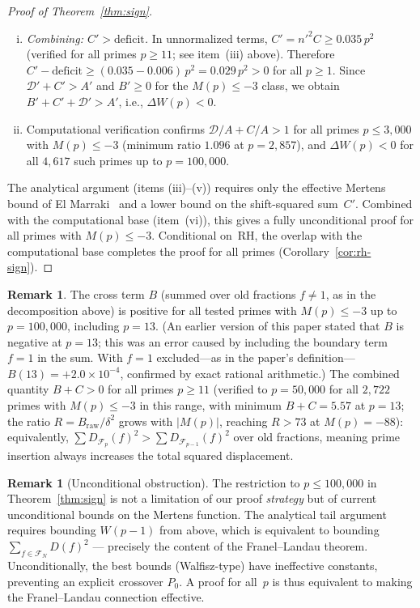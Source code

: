 \documentclass[11pt]{article}
\theoremstyle{definition}
\newtheorem{remark}[theorem]{Remark}
\newcommand{\F}{\mathcal{F}}
\begin{document}
\begin{proof}[Proof of Theorem~\ref{thm:sign}]
\begin{enumerate}[(i)]
\item \emph{Combining: $C' > \text{deficit}$.}
In unnormalized terms, $C' = {n'}^2 C \ge 0.035\,p^2$
(verified for all primes $p \ge 11$; see item~(iii) above).
Therefore $C' - \text{deficit} \ge (0.035 - 0.006)\,p^2
= 0.029\,p^2 > 0$ for all $p \ge 1$.
Since $\mathcal{D}' + C' > A'$ and $B' \ge 0$ for the
$M(p) \le -3$ class, we obtain
$B' + C' + \mathcal{D}' > A'$, i.e., $\Delta W(p) < 0$.

\item Computational verification confirms
$\mathcal{D}/A + C/A > 1$ for all primes $p \le 3{,}000$
with $M(p) \le -3$ (minimum ratio $1.096$ at $p = 2{,}857$),
and $\Delta W(p) < 0$ for all $4{,}617$ such primes up to
$p = 100{,}000$.
\end{enumerate}

The analytical argument (items (iii)--(v)) requires only the
effective Mertens bound of El Marraki~\cite{ElMarraki1995}
and a lower bound on the shift-squared sum~$C'$.  Combined
with the computational base (item~(vi)), this gives a fully
unconditional proof for all primes with $M(p) \le -3$.
Conditional on~RH, the overlap with the computational
base completes the proof for all primes
(Corollary~\ref{cor:rh-sign}).
\end{proof}

\begin{remark}
The cross term $B$ (summed over old fractions $f \ne 1$,
as in the decomposition above) is positive for all tested
primes with $M(p) \le -3$ up to $p = 100{,}000$, including
$p = 13$.  (An earlier version of this paper stated that
$B$ is negative at $p = 13$; this was an error caused by
including the boundary term $f = 1$ in the sum.  With $f = 1$
excluded---as in the paper's definition---$B(13) = +2.0
\times 10^{-4}$, confirmed by exact rational arithmetic.)
The combined quantity $B + C > 0$ for all primes
$p \ge 11$ (verified to $p = 50{,}000$ for all $2{,}722$ primes
with $M(p) \le -3$ in this range, with minimum $B+C = 5.57$
at $p = 13$; the ratio $R = B_{\mathrm{raw}}/\delta^2$ grows
with $|M(p)|$, reaching $R > 73$ at $M(p) = -88$):
equivalently, $\sum D_{\F_p}(f)^2 > \sum D_{\F_{p-1}}(f)^2$
over old fractions, meaning prime insertion always increases
the total squared displacement.
\end{remark}

\begin{remark}[Unconditional obstruction]\label{rem:obstruction}
The restriction to $p \le 100{,}000$ in
Theorem~\ref{thm:sign} is not a limitation of our proof
\emph{strategy} but of current unconditional bounds on the
Mertens function.  The analytical tail argument requires
bounding $W(p-1)$ from above, which is equivalent to
bounding $\sum_{f \in \F_N}D(f)^2$ --- precisely the content
of the Franel--Landau theorem.  Unconditionally, the best
bounds (Walfisz-type) have ineffective constants, preventing
an explicit crossover $P_0$.  A proof for all~$p$ is thus
equivalent to making the Franel--Landau connection effective.
\end{remark}
\end{document}
